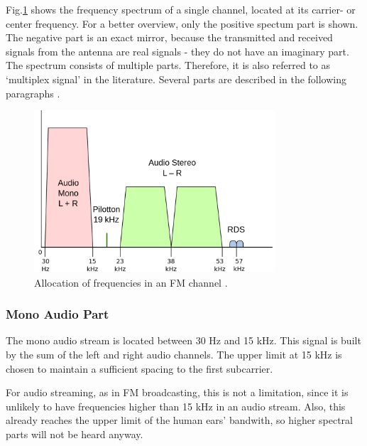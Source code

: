 Fig.\ref{fig_channel_baseband_freqs} shows the frequency spectrum of a single channel, located at its carrier- or center frequency.
For a better overview, only the positive spectum part is shown.
The negative part is an exact mirror, because the transmitted and received signals from the antenna are real signals - they do not have an imaginary part.
The spectrum consists of multiple parts. Therefore, it is also referred to as `multiplex signal' in the literature. Several parts are described in the following paragraphs \cite{EbuFmRegulators}\cite{EtsiFmSoundBroadcastingServiceHarmonizedStandard}\cite{ElectronicsNotesFmTutorial}.

\begin{figure}[!h]
  \centering
    \includegraphics[width=9cm]{img/fm-channel-baseband.png}
  \caption{Allocation of frequencies in an FM channel \cite{FigFmChannelFreqSpectrum}.}
  \label{fig_channel_baseband_freqs}
\end{figure}

\subsubsection{Mono Audio Part}

The mono audio stream is located between 30 Hz and 15 kHz.
This signal is built by the sum of the left and right audio channels.
The upper limit at 15 kHz is chosen to maintain a sufficient spacing to the first subcarrier.

For audio streaming, as in FM broadcasting, this is not a limitation, since it is unlikely to have frequencies higher than 15 kHz in an audio stream.
Also, this already reaches the upper limit of the human ears' bandwith, so higher spectral parts will not be heard anyway.

